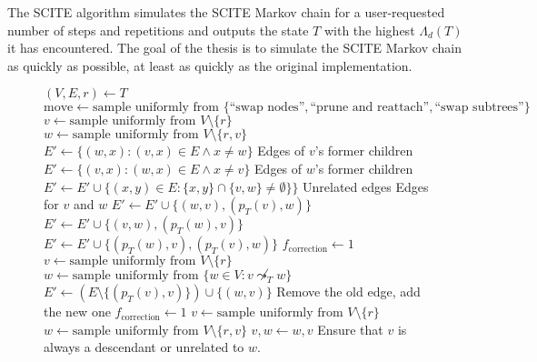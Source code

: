The \ac{SCITE} algorithm simulates the \ac{SCITE} Markov chain for a user-requested number of steps and repetitions and outputs the state $T$ with the highest $\Lambda_d(T)$ it has encountered. The goal of the thesis is to simulate the \ac{SCITE} Markov chain as quickly as possible, at least as quickly as the original implementation.

\begin{figure}
    \begin{algorithmic}
            \State $(V, E, r) \leftarrow T$
            \State $\mathrm{move} \leftarrow \text{sample uniformly from } \{\text{``swap nodes''}, \text{``prune and reattach''}, \text{``swap subtrees''}\}$
                \State $v \leftarrow \text{sample uniformly from } V \setminus \{r\}$
                \State $w \leftarrow \text{sample uniformly from } V \setminus \{r, v\}$
                \State $E' \leftarrow \{(w, x) : (v, x) \in E \wedge x \neq w\}$ \Comment Edges of $v$'s former children
                \State $E' \leftarrow \{(v, x) : (w, x) \in E \wedge x \neq v\}$ \Comment Edges of $w$'s former children
                \State $E' \leftarrow E' \cup \{(x, y) \in E: \{x, y\} \cap \{v, w\} \neq \emptyset\}\}$ \Comment Unrelated edges
                 \Comment Edges for $v$ and $w$
                    \State $E' \leftarrow E' \cup \{(w, v), (p_T(v), w)\}$
                    \State $E' \leftarrow E' \cup \{(v, w), (p_T(w), v)\}$
                \Else
                    \State $E' \leftarrow E' \cup \{(p_T(w), v), (p_T(v), w)\}$
                \EndIf
                \State $f_\mathrm{correction} \leftarrow 1$
                \State $v \leftarrow \text{sample uniformly from } V \setminus \{r\}$
                \State $w \leftarrow \text{sample uniformly from } \{w \in V : v \not\leadsto_T w\}$
                \State $E' \leftarrow \left(E \setminus \{(p_T(v), v)\}\right)  \cup \{(w, v)\}$ \Comment Remove the old edge, add the new one
                \State $f_\mathrm{correction} \leftarrow 1$
                \State $v \leftarrow \text{sample uniformly from } V \setminus \{r\}$
                \State $w \leftarrow \text{sample uniformly from } V \setminus \{r, v\}$
                    \State $v, w \leftarrow w, v$ \Comment Ensure that $v$ is always a descendant or unrelated to $w$.

\end{algorithmic}
\end{figure}
